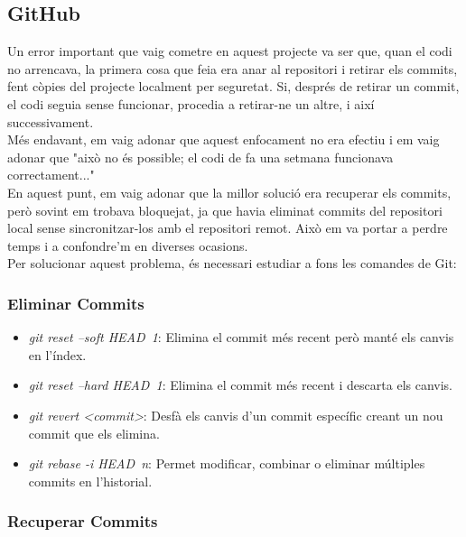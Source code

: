 \documentclass[a4paper,12pt,twoside]{ThesisStyle}
\begin{document}
\subsection{GitHub}
\label{subsec: GitHub}

Un error important que vaig cometre en aquest projecte va ser que, quan el codi no arrencava, la primera cosa que feia era anar al repositori i retirar els commits, fent còpies del projecte localment per seguretat. Si, després de retirar un commit, el codi seguia sense funcionar, procedia a retirar-ne un altre, i així successivament.\\

Més endavant, em vaig adonar que aquest enfocament no era efectiu i em vaig adonar que "això no és possible; el codi de fa una setmana funcionava correctament..."\\

En aquest punt, em vaig adonar que la millor solució era recuperar els commits, però sovint em trobava bloquejat, ja que havia eliminat commits del repositori local sense sincronitzar-los amb el repositori remot. Això em va portar a perdre temps i a confondre'm en diverses ocasions.\\

Per solucionar aquest problema, és necessari estudiar a fons les comandes de Git:


\subsubsection{Eliminar Commits}

\begin{itemize}
    \item \textit{git reset --soft HEAD~1}: Elimina el commit més recent però manté els canvis en l'índex.
    \item \textit{git reset --hard HEAD~1}: Elimina el commit més recent i descarta els canvis.
    \item \textit{git revert <commit>}: Desfà els canvis d'un commit específic creant un nou commit que els elimina.
    \item \textit{git rebase -i HEAD~n}: Permet modificar, combinar o eliminar múltiples commits en l'historial.
  \end{itemize}

\subsubsection{Recuperar Commits}
\end{document}
